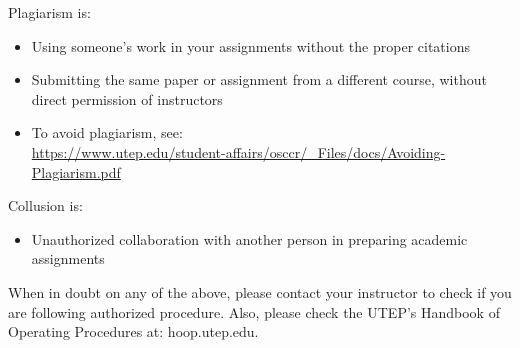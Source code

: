 \documentclass[12pt]{scrartcl}
\begin{document}
Plagiarism is:
\begin{itemize}
\item Using someone’s work in your assignments without the proper citations
\item Submitting the same paper or assignment from a different course, without direct permission of instructors
\item[]\vspace{1em} To avoid plagiarism, see: \\{\footnotesize\url{https://www.utep.edu/student-affairs/osccr/_Files/docs/Avoiding-Plagiarism.pdf}}
\end{itemize}
                               
Collusion is:
\begin{itemize}
\item Unauthorized collaboration with another person in preparing academic assignments
\end{itemize}

\begin{tcolorbox}[colback=red!5,colframe=red!75!black,title=Important!]
When in doubt on any of the above, please contact your instructor to check if you are following authorized procedure. Also, please check the UTEP’s Handbook of Operating Procedures at: hoop.utep.edu. 
\end{tcolorbox}

\end{document}
